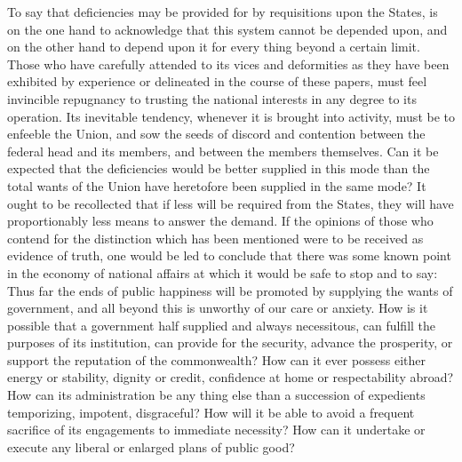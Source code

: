 To say that deficiencies may be provided for by requisitions upon the States, is on the one hand to acknowledge that this system cannot be depended upon, and on the other hand to depend upon it for every thing beyond a certain limit. 
Those who have carefully attended to its vices and deformities as they have been exhibited by experience or delineated in the course of these papers, must feel invincible repugnancy to trusting the national interests in any degree to its operation. 
Its inevitable tendency, whenever it is brought into activity, must be to enfeeble the Union, and sow the seeds of discord and contention between the federal head and its members, and between the members themselves. 
Can it be expected that the deficiencies would be better supplied in this mode than the total wants of the Union have heretofore been supplied in the same mode? 
It ought to be recollected that if less will be required from the States, they will have proportionably less means to answer the demand. 
If the opinions of those who contend for the distinction which has been mentioned were to be received as evidence of truth, one would be led to conclude that there was some known point in the economy of national affairs at which it would be safe to stop and to say: Thus far the ends of public happiness will be promoted by supplying the wants of government, and all beyond this is unworthy of our care or anxiety. 
How is it possible that a government half supplied and always necessitous, can fulfill the purposes of its institution, can provide for the security, advance the prosperity, or support the reputation of the commonwealth? 
How can it ever possess either energy or stability, dignity or credit, confidence at home or respectability abroad? 
How can its administration be any thing else than a succession of expedients temporizing, impotent, disgraceful? 
How will it be able to avoid a frequent sacrifice of its engagements to immediate necessity? 
How can it undertake or execute any liberal or enlarged plans of public good?

